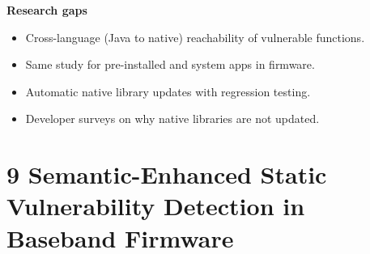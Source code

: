 \documentclass[11pt,a4paper]{article}
\begin{document}
\begin{enumerate}
    \vspace{4pt}
    \textbf{Research gaps}
    \begin{itemize}
        \item Cross-language (Java to native) reachability of vulnerable functions.
        \item Same study for pre-installed and system apps in firmware.
        \item Automatic native library updates with regression testing.
        \item Developer surveys on why native libraries are not updated.
    \end{itemize}

\end{enumerate}

\newpage

\section{9 Semantic-Enhanced Static Vulnerability Detection in Baseband Firmware}
\end{document}
